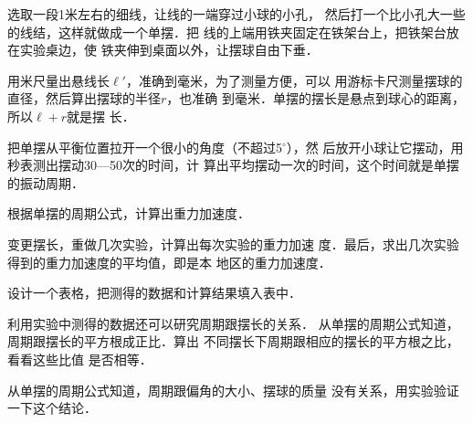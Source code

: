 选取一段1米左右的细线，让线的一端穿过小球的小孔，
然后打一个比小孔大一些的线结，这样就做成一个单摆．把
线的上端用铁夹固定在铁架台上，把铁架台放在实验桌边，使
铁夹伸到桌面以外，让摆球自由下垂．

用米尺量出悬线长$\ell'$，准确到毫米，为了测量方便，可以
用游标卡尺测量摆球的直径，然后算出摆球的半径$r$，也准确
到毫米．单摆的摆长是悬点到球心的距离，所以$\ell+r$就是摆
长．

把单摆从平衡位置拉开一个很小的角度（不超过5$^\circ$），然
后放开小球让它摆动，用秒表测出摆动30—50次的时间，计
算出平均摆动一次的时间，这个时间就是单摆的振动周期．

根据单摆的周期公式，计算出重力加速度．

变更摆长，重做几次实验，计算出每次实验的重力加速
度．最后，求出几次实验得到的重力加速度的平均值，即是本
地区的重力加速度．

设计一个表格，把测得的数据和计算结果填入表中．

利用实验中测得的数据还可以研究周期跟摆长的关系．
从单摆的周期公式知道，周期跟摆长的平方根成正比．算出
不同摆长下周期跟相应的摆长的平方根之比，看看这些比值
是否相等．

从单摆的周期公式知道，周期跟偏角的大小、摆球的质量
没有关系，用实验验证一下这个结论．


